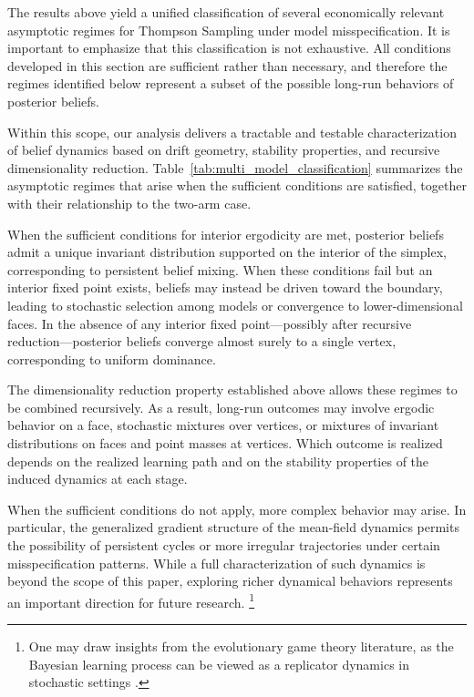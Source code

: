 \documentclass[12pt]{article}
\begin{document}
The results above yield a unified classification of several economically relevant asymptotic regimes for Thompson Sampling under model misspecification.
It is important to emphasize that this classification is not exhaustive.
All conditions developed in this section are sufficient rather than necessary, and therefore the regimes identified below represent a subset of the possible long-run behaviors of posterior beliefs.

Within this scope, our analysis delivers a tractable and testable characterization of belief dynamics based on drift geometry, stability properties, and recursive dimensionality reduction.
Table~\ref{tab:multi_model_classification} summarizes the asymptotic regimes that arise when the sufficient conditions are satisfied, together with their relationship to the two-arm case.

When the sufficient conditions for interior ergodicity are met, posterior beliefs admit a unique invariant distribution supported on the interior of the simplex, corresponding to persistent belief mixing.
When these conditions fail but an interior fixed point exists, beliefs may instead be driven toward the boundary, leading to stochastic selection among models or convergence to lower-dimensional faces.
In the absence of any interior fixed point—possibly after recursive reduction—posterior beliefs converge almost surely to a single vertex, corresponding to uniform dominance.

The dimensionality reduction property established above allows these regimes to be combined recursively.
As a result, long-run outcomes may involve ergodic behavior on a face, stochastic mixtures over vertices, or mixtures of invariant distributions on faces and point masses at vertices.
Which outcome is realized depends on the realized learning path and on the stability properties of the induced dynamics at each stage.

When the sufficient conditions do not apply, more complex behavior may arise.
In particular, the generalized gradient structure of the mean-field dynamics permits the possibility of persistent cycles or more irregular trajectories under certain misspecification patterns.
While a full characterization of such dynamics is beyond the scope of this paper, exploring richer dynamical behaviors represents an important direction for future research. \footnote{One may draw insights from the evolutionary game theory literature, as the Bayesian learning process can be viewed as a replicator dynamics in stochastic settings \citep{weibullEvolutionaryGameTheory1997}.}
\end{document}
